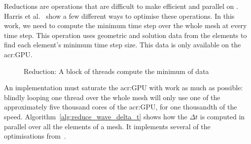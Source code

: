Reductions are operations that are difficult to make efficient and parallel on .
Harris et al.~\cite{Harris2007} show a few different ways to optimise these operations. In this
work, we need to compute the minimum time step over the whole mesh at every time step. This
operation uses geometric and solution data from the elements to find each element's minimum time
step size. This data is only available on the \acrshort{acr:GPU}. 

\begin{figure}[H]
	\centering
	
	\caption{Reduction: A block of threads compute the minimum of data}\label{fig:reduction}
\end{figure}

An implementation must saturate the \acrshort{acr:GPU} with work as much as possible: blindly
looping one thread over the whole mesh will only use one of the approximately five thousand cores of
the \acrshort{acr:GPU}, for one thousandth of the speed. Algorithm~\ref{alg:reduce_wave_delta_t}
shows how the \(\Delta t\) is computed in parallel over all the elements of a mesh. It implements
several of the optimisations from~\cite{Harris2007}.

